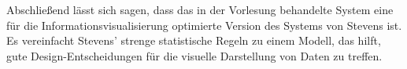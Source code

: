 \documentclass[10pt, a4paper]{article}
\begin{document}
Abschließend lässt sich sagen, dass das in der Vorlesung behandelte System eine für die Informationsvisualisierung optimierte Version des Systems von Stevens ist. 
Es vereinfacht Stevens’ strenge statistische Regeln zu einem Modell, das hilft, gute Design-Entscheidungen für die visuelle Darstellung von Daten zu treffen.
\end{document}
